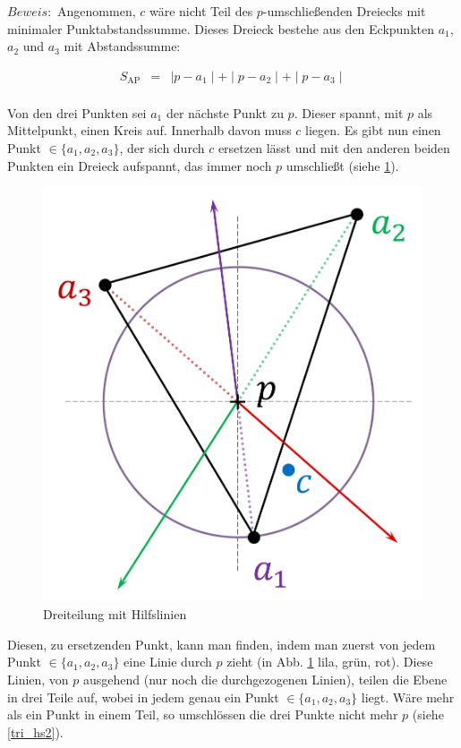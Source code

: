 \documentclass[a4paper]{extarticle}
\begin{document}
    $Beweis:$
    Angenommen, $c$ wäre nicht Teil des $p$-umschließenden Dreiecks mit minimaler Punktabstandssumme.
    Dieses Dreieck bestehe aus den Eckpunkten $a_1$, $a_2$ und $a_3$ mit Abstandssumme:

    \begin{eqnarray*}
        S_{\text{AP}} &=& \mid p - a_1 \mid + \mid p - a_2 \mid + \mid p - a_3 \mid \\
    \end{eqnarray*}
    
    Von den drei Punkten sei $a_1$ der nächste Punkt zu $p$. Dieser spannt, mit $p$ als Mittelpunkt, 
    einen Kreis auf. Innerhalb davon muss $c$ liegen.
    Es gibt nun einen Punkt $\in \{ a_1, a_2, a_3 \}$, der sich durch $c$ ersetzen lässt und
    mit den anderen beiden Punkten ein Dreieck aufspannt, das immer noch $p$ umschließt 
    (siehe \ref{fig:triangulation_2}).

    \begin{figure}[!ht]
        \centering	
        \includegraphics[scale=0.15]{bilder/tri_2.pdf}
        \caption{Dreiteilung mit Hilfslinien}
        \label{fig:triangulation_2}
    \end{figure}

    Diesen, zu ersetzenden Punkt, kann man finden, indem man zuerst von jedem Punkt 
    $\in \{ a_1, a_2, a_3 \}$ eine Linie durch $p$ zieht (in Abb. \ref{fig:triangulation_2} lila, 
    grün, rot). Diese Linien, von $p$ ausgehend (nur noch die durchgezogenen Linien), teilen die 
    Ebene in drei Teile auf, wobei in jedem genau ein Punkt $\in \{ a_1, a_2, a_3 \}$ liegt.
    Wäre mehr als ein Punkt in einem Teil, so umschlössen die drei Punkte nicht mehr $p$ 
    (siehe \ref{tri_hs2}).
\end{document}
